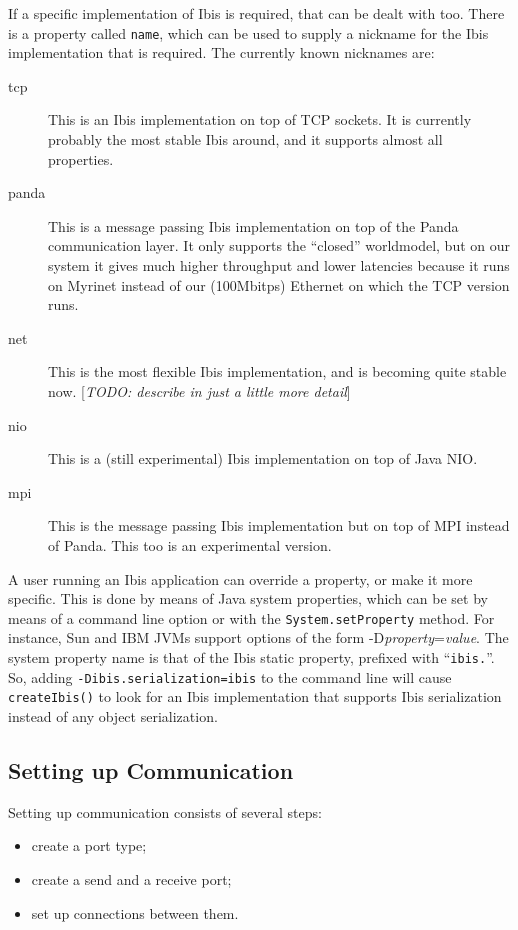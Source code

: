 \documentclass[10pt]{article}
\newcommand{\remark}[1]{[\emph{#1}]}
\begin{document}
\noindent
If a specific implementation of Ibis is required, that can be dealt with too.
There is a property called \texttt{name}, which can be used to supply a nickname
for the Ibis implementation that is required.
The currently known nicknames are:
\begin{description}
\item[tcp]
This is an Ibis implementation on top of TCP sockets. It is currently 
probably the most stable Ibis around, and it supports almost all properties.
\item[panda]
This is a message passing Ibis implementation on top of the Panda
communication layer. It only supports the ``closed'' worldmodel,
but on our system it gives much higher throughput and lower latencies
because it runs on Myrinet instead of our (100Mbitps) Ethernet on which
the TCP version runs.
\item[net]
This is the most flexible Ibis implementation, and is becoming quite
stable now.
\remark{TODO: describe in just a little more detail}
\item[nio]
This is a (still experimental) Ibis implementation on top of Java NIO.
\item[mpi]
This is the message passing Ibis implementation but on top of MPI instead
of Panda. This too is an experimental version.
\end{description}

\noindent
A user running an Ibis application can override a property, or make
it more specific. This is done by means of Java system properties,
which can be set by means of a command line option or with the
\texttt{System.setProperty} method.
For instance, Sun and IBM JVMs support options of the form
-D\emph{property}=\emph{value}.  The system property name is that
of the Ibis static property, prefixed with ``\texttt{ibis.}''.  So,
adding \texttt{-Dibis.serialization=ibis} to the command line will cause
\texttt{createIbis()} to look for an Ibis implementation
that supports Ibis serialization instead of any object serialization.

\subsection{Setting up Communication}

Setting up communication consists of several steps:
\begin{itemize}
\item
create a port type;
\item
create a send and a receive port;
\item
set up connections between them.
\end{itemize}
\end{document}

